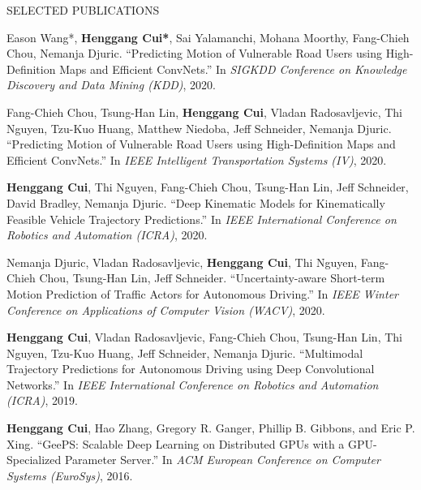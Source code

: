 \documentclass{resume} %
\begin{document}
\begin{rSection}{SELECTED PUBLICATIONS}
{    \item
    [5]
        Eason Wang*, {\bf Henggang Cui*}, Sai Yalamanchi, Mohana Moorthy, Fang-Chieh Chou, Nemanja Djuric.
        ``Predicting Motion of Vulnerable Road Users using High-Definition Maps and Efficient ConvNets.''
        In \emph{SIGKDD Conference on Knowledge Discovery and Data Mining (KDD)}, 2020.
    \item
    [6]
        Fang-Chieh Chou, Tsung-Han Lin, {\bf Henggang Cui}, Vladan Radosavljevic, Thi Nguyen, Tzu-Kuo Huang, Matthew Niedoba, Jeff Schneider, Nemanja Djuric.
        ``Predicting Motion of Vulnerable Road Users using High-Definition Maps and Efficient ConvNets.''
        In \emph{IEEE Intelligent Transportation Systems (IV)}, 2020.
    \item
    [7]
        {\bf Henggang Cui}, Thi Nguyen, Fang-Chieh Chou, Tsung-Han Lin, Jeff Schneider, David Bradley, Nemanja Djuric.
        ``Deep Kinematic Models for Kinematically Feasible Vehicle Trajectory Predictions.''
        In \emph{IEEE International Conference on Robotics and Automation (ICRA)}, 2020.
    \item
    [8]
        Nemanja Djuric, Vladan Radosavljevic, {\bf Henggang Cui}, Thi Nguyen, Fang-Chieh Chou, Tsung-Han Lin, Jeff Schneider.
        ``Uncertainty-aware Short-term Motion Prediction of Traffic Actors for Autonomous Driving.''
        In \emph{IEEE Winter Conference on Applications of Computer Vision (WACV)}, 2020.
    \item
    [9]
        {\bf Henggang Cui}, Vladan Radosavljevic, Fang-Chieh Chou, Tsung-Han Lin, Thi Nguyen, Tzu-Kuo Huang, Jeff Schneider, Nemanja Djuric.
        ``Multimodal Trajectory Predictions for Autonomous Driving using Deep Convolutional Networks.''
        In \emph{IEEE International Conference on Robotics and Automation (ICRA)}, 2019.
    \item
    [10]
        {\bf Henggang Cui}, Hao Zhang, Gregory R. Ganger, Phillip B. Gibbons, and Eric P. Xing.
        ``GeePS: Scalable Deep Learning on Distributed GPUs with a GPU-Specialized Parameter Server.''
        In \emph{ACM European Conference on Computer Systems (EuroSys)}, 2016.
}
\end{rSection}
\end{document}

